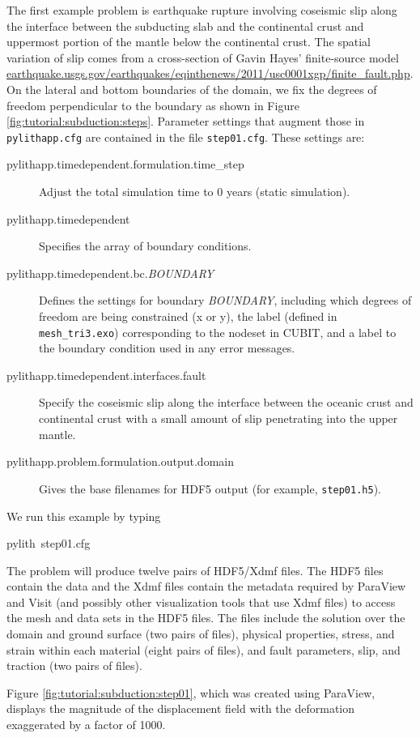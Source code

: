 The first example problem is earthquake rupture involving coseismic
slip along the interface between the subducting slab and the continental
crust and uppermost portion of the mantle below the continental crust.
The spatial variation of slip comes from a cross-section of Gavin
Hayes' finite-source model \url{earthquake.usgs.gov/earthquakes/eqinthenews/2011/usc0001xgp/finite_fault.php}.
On the lateral and bottom boundaries of the domain, we fix the degrees
of freedom perpendicular to the boundary as shown in Figure \vref{fig:tutorial:subduction:steps}.
Parameter settings that augment those in \texttt{pylithapp.cfg} are
contained in the file \texttt{step01.cfg}. These settings are:
\begin{description}
\item [{pylithapp.timedependent.formulation.time\_step}] Adjust the total
simulation time to 0 years (static simulation).
\item [{pylithapp.timedependent}] Specifies the array of boundary conditions.
\item [{pylithapp.timedependent.bc.\textit{BOUNDARY}}] Defines the settings
for boundary \textit{BOUNDARY}, including which degrees of freedom
are being constrained (x or y), the label (defined in\texttt{ mesh\_tri3.exo})
corresponding to the nodeset in CUBIT, and a label to the boundary
condition used in any error messages.
\item [{pylithapp.timedependent.interfaces.fault}] Specify the coseismic
slip along the interface between the oceanic crust and continental
crust with a small amount of slip penetrating into the upper mantle.
\item [{pylithapp.problem.formulation.output.domain}] Gives the base filenames
for HDF5 output (for example, \texttt{step01.h5}).
\end{description}
We run this example by typing
\begin{lyxcode}
pylith~step01.cfg
\end{lyxcode}
The problem will produce twelve pairs of HDF5/Xdmf files. The HDF5
files contain the data and the Xdmf files contain the metadata required
by ParaView and Visit (and possibly other visualization tools that
use Xdmf files) to access the mesh and data sets in the HDF5 files.
The files include the solution over the domain and ground surface
(two pairs of files), physical properties, stress, and strain within
each material (eight pairs of files), and fault parameters, slip,
and traction (two pairs of files). 

Figure \vref{fig:tutorial:subduction:step01}, which was created using
ParaView, displays the magnitude of the displacement field with the
deformation exaggerated by a factor of 1000. 

